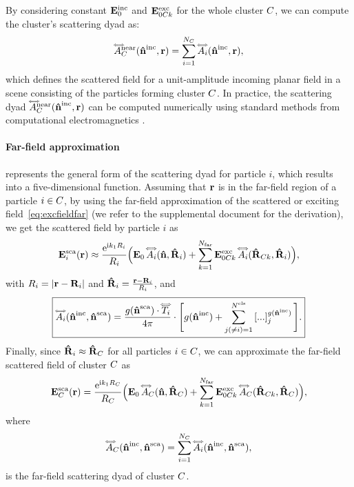 By considering constant $\mathbf{E}^\text{inc}_0$ and $\mathbf{E}^\text{exc}_{0C k}$ for the whole cluster $C$, we can compute the cluster's scattering dyad as:
\begin{equation}
    \accentset{\Longleftrightarrow}{A}_C^\text{near}(\mathbf{\hat{n}}^{\text{inc}},\mathbf{r}) = \sum_{i=1}^{N_C} \accentset{\Longleftrightarrow}{A}_i(\mathbf{\hat{n}}^{\text{inc}},\mathbf{r}),
    \label{eq:scatdyadcluster_near}
\end{equation}
which defines the scattered field for a unit-amplitude incoming planar field in a scene consisting of the particles forming cluster $C$.
In practice, the scattering dyad $\accentset{\Longleftrightarrow}{A}_C^\text{near}(\mathbf{\hat{n}}^{\text{inc}},\mathbf{r})$ can be computed numerically using standard methods from computational electromagnetics \cite{mishchenko2014electromagnetic}.


\paragraph{Far-field approximation}
 represents the general form of the scattering dyad for particle $i$, which results into a five-dimensional function. Assuming that $\mathbf{r}$ is in the far-field region of a particle $i\in C$, by using the far-field approximation of the scattered or exciting field~\eqref{eq:excfieldfar} (we refer to the supplemental document for the derivation), we get the scattered field by particle $i$ as
\begin{align}
    \mathbf{E}^\text{sca}_i(\mathbf{r}) \approx \frac{\mathrm{e}^{\text{i} k_1 R_i}}{R_i} \Big(\mathbf{E}_0 \,  \accentset{\Longleftrightarrow}{A}_i(\mathbf{\hat{n}},\mathbf{\hat{R}}_i) 
    + \sum_{k=1}^{N_{\text{far}}} \mathbf{E}^\text{exc}_{0C k} \, \accentset{\Longleftrightarrow}{A}_i(\mathbf{\hat{R}}_{C k},\mathbf{\hat{R}}_i) \Big),
    \label{eq:farscatfield}
\end{align}
with $R_i=|\mathbf{r}-\mathbf{R}_i|$ and $\mathbf{\hat{R}}_i=\frac{\mathbf{r}-\mathbf{R}_i}{R_i}$, and
\begin{equation}
    \label{eq:farscatdyad}
    \boxed{%
        \ScaDyad_i(\dwi,\dws) = \frac{g(\dws)\cdot \dyad{T}_i}{4\pi} \cdot\Bigg[ \sGreenProp(\dwi) + \sum_{j(\neq i)=1}^\Ncls \left[...\right]_j^{\sGreenProp(\dwi)} \Bigg].
    }
\end{equation}
Finally, since $\mathbf{\hat{R}}_i\approx\mathbf{\hat{R}}_C$ for all particles $i\in C$, we can approximate the far-field scattered field of cluster $C$ as
\begin{equation}
    \mathbf{E}^\text{sca}_C(\mathbf{r}) = \frac{\mathrm{e}^{\text{i} k_1 R_C}}{R_C}\Big( \mathbf{E}_0 \,  \accentset{\Longleftrightarrow}{A}_C(\mathbf{\hat{n}},\mathbf{\hat{R}}_C) + \sum_{k=1}^{N_{\text{far}}} \mathbf{E}^\text{exc}_{0C k} \, \accentset{\Longleftrightarrow}{A}_C(\mathbf{\hat{R}}_{C k},\mathbf{\hat{R}}_C) \Big),
    \label{eq:farscatfieldcluster}
\end{equation}
where
\begin{equation}
   \accentset{\Longleftrightarrow}{A}_C(\mathbf{\hat{n}}^{\text{inc}},\mathbf{\hat{n}}^{\text{sca}}) = \sum_{i=1}^{N_C}\accentset{\Longleftrightarrow}{A}_i(\mathbf{\hat{n}}^{\text{inc}},\mathbf{\hat{n}}^{\text{sca}}),
   \label{eq:farscatdyadC}
\end{equation}
is the far-field scattering dyad of cluster $C$.

